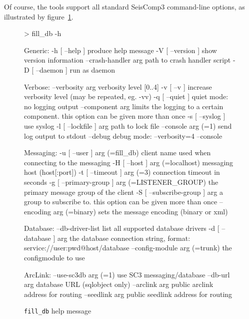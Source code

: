 \documentclass[11pt,a4paper,titlepage]{article}
\newcommand{\cmd}[1]{\texttt{#1}}
\begin{document}
Of course, the tools support all standard SeisComp3 command-line options, as
illustrated by figure~\ref{filldbhelp}.

\begin{figure}[htp!]
\centering
\begin{listing}
> fill_db -h

Generic:
  -h [ --help ]         produce help message
  -V [ --version ]      show version information
  --crash-handler arg   path to crash handler script
  -D [ --daemon ]       run as daemon

Verbose:
  --verbosity arg       verbosity level [0..4]
  -v [ --v ]            increase verbosity level (may be repeated, eg. -vv)
  -q [ --quiet ]        quiet mode: no logging output
  --component arg       limits the logging to a certain component. this option 
                        can be given more than once
  -s [ --syslog ]       use syslog
  -l [ --lockfile ] arg path to lock file
  --console arg (=1)    send log output to stdout
  --debug               debug mode: --verbosity=4 --console

Messaging:
  -u [ --user ] arg (=fill_db)                 client name used when connecting
                                               to the messaging
  -H [ --host ] arg (=localhost)               messaging host (host[:port])
  -t [ --timeout ] arg (=3)                    connection timeout in seconds
  -g [ --primary-group ] arg (=LISTENER_GROUP) the primary message group of the
                                               client
  -S [ --subscribe-group ] arg                 a group to subscribe to.  this 
                                               option can be given more than 
                                               once
  --encoding arg (=binary)                     sets the message encoding 
                                               (binary or xml)

Database:
  --db-driver-list             list all supported database drivers
  -d [ --database ] arg        the database connection string, format: 
                               service://user:pwd@host/database
  --config-module arg (=trunk) the configmodule to use

ArcLink:
  --use-sc3db arg (=1)  use SC3 messaging/database
  --db-url arg          database URL (sqlobject only)
  --arclink arg         public arclink address for routing
  --seedlink arg        public seedlink address for routing
\end{listing}
\caption{\cmd{fill\_db} help message}\label{filldbhelp}
\end{figure}
\end{document}
